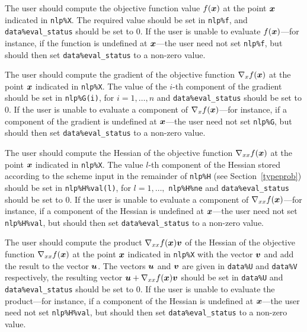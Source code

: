 \documentclass{galahad}
\begin{document}
\begin{description}
 The user should compute the objective function
     value $f({\bm{x}})$ at the point ${\bm{x}}$ indicated in {\tt nlp\%X}.
     The required value should be set in {\tt nlp\%f}, and
     {\tt data\%eval\_status} should be set to 0. If the user is
     unable to evaluate $f({\bm{x}})$---for instance, if the function is
     undefined at ${\bm{x}}$---the user need not set {\tt nlp\%f}, but
     should then set {\tt data\%eval\_status} to a non-zero value.

 The user should compute the gradient
     of the objective function $\nabla_x f({\bm{x}})$ at the point ${\bm{x}}$
     indicated in {\tt nlp\%X}.
     The value of the $i$-th component of the gradient should be set
     in {\tt nlp\%G(i)},      for $i = 1, \ldots, n$ and
     {\tt data\%eval\_status} should be set to 0. If the user is
     unable to evaluate a component of $\nabla_x f({\bm{x}})$---for instance,
     if a component of the gradient is
     undefined at ${\bm{x}}$---the user need not set {\tt nlp\%G}, but
     should then set {\tt data\%eval\_status} to a non-zero value.

 The user should compute the Hessian
     of the objective function $\nabla_{xx} f({\bm{x}})$ at the point ${\bm{x}}$
     indicated in {\tt nlp\%X}.
     The value $l$-th component of the Hessian stored according to the
     scheme input in the remainder of {\tt nlp\%H} (see Section~\ref{typeprob})
     should be set in {\tt nlp\%H\%val(l)},
     for $l = 1, \ldots,$ {\tt  nlp\%H\%ne} and
     {\tt data\%eval\_status} should be set to 0. If the user is
     unable to evaluate a component of $\nabla_{xx} f({\bm{x}})$---for instance,
     if a component of the Hessian is
     undefined at ${\bm{x}}$---the user need not set {\tt nlp\%H\%val}, but
     should then set {\tt data\%eval\_status} to a non-zero value.

 The user should compute the product
     $\nabla_{xx} f({\bm{x}}){\bm{v}}$ of the Hessian
     of the objective function $\nabla_{xx} f({\bm{x}})$ at the point ${\bm{x}}$
     indicated in {\tt nlp\%X} with the vector ${\bm{v}}$ and add the result to
     the vector ${\bm{u}}$. The vectors ${\bm{u}}$ and ${\bm{v}}$ are given in
     {\tt data\%U} and {\tt data\%V} respectively, the resulting
     vector ${\bm{u}} + \nabla_{xx} f({\bm{x}}){\bm{v}}$ should be set in {\tt data\%U}
     and  {\tt data\%eval\_status} should be set to 0. If the user is
     unable to evaluate the product---for instance,
     if a component of the Hessian is
     undefined at ${\bm{x}}$---the user need not set {\tt nlp\%H\%val}, but
     should then set {\tt data\%eval\_status} to a non-zero value.


\end{description}
\end{document}
